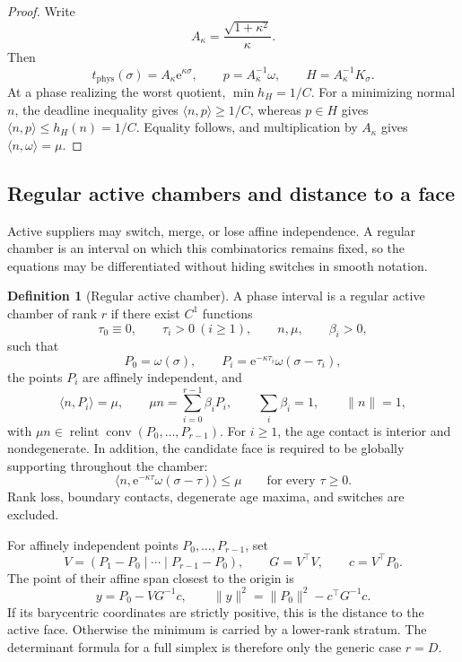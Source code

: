 \documentclass[10pt,a4paper]{article}
\newcommand{\conv}{\operatorname{conv}}
\newcommand{\relint}{\operatorname{relint}}
\newcommand{\e}{\mathrm{e}}
\newcommand{\tphys}{t_{\mathrm{phys}}}
\theoremstyle{plain}
\theoremstyle{definition}
\newtheorem{definition}[theorem]{Definition}
\theoremstyle{remark}
\begin{document}
\begin{proof}
Write
\[
  A_\kappa=\frac{\sqrt{1+\kappa^2}}{\kappa}.
\]
Then
\[
  \tphys(\sigma)=A_\kappa\e^{\kappa\sigma},
  \qquad
  p=A_\kappa^{-1}\omega,
  \qquad
  H=A_\kappa^{-1}K_\sigma.
\]
At a phase realizing the worst quotient, $\min h_H=1/C$. For a minimizing normal $n$, the deadline inequality gives $\langle n,p\rangle\ge1/C$, whereas $p\in H$ gives $\langle n,p\rangle\le h_H(n)=1/C$. Equality follows, and multiplication by $A_\kappa$ gives $\langle n,\omega\rangle=\mu$.
\end{proof}

\subsection{Regular active chambers and distance to a face}

Active suppliers may switch, merge, or lose affine independence. A regular chamber is an interval on which this combinatorics remains fixed, so the equations may be differentiated without hiding switches in smooth notation.

\begin{definition}[Regular active chamber]
A phase interval is a regular active chamber of rank $r$ if there exist $C^1$ functions
\[
  \tau_0\equiv0,
  \qquad \tau_i>0\ (i\ge1),
  \qquad n,\mu,
  \qquad \beta_i>0,
\]
such that
\[
  P_0=\omega(\sigma),
  \qquad
  P_i=\e^{-\kappa\tau_i}\omega(\sigma-\tau_i),
\]
the points $P_i$ are affinely independent, and
\[
  \langle n,P_i\rangle=\mu,
  \qquad
  \mu n=\sum_{i=0}^{r-1}\beta_iP_i,
  \qquad
  \sum_i\beta_i=1,
  \qquad
  \|n\|=1,
\]
with $\mu n\in\relint\conv(P_0,\ldots,P_{r-1})$. For $i\ge1$, the age contact is interior and nondegenerate. In addition, the candidate face is required to be globally supporting throughout the chamber:
\[
  \langle n,\e^{-\kappa\tau}\omega(\sigma-\tau)\rangle\le\mu
  \qquad\text{for every }\tau\ge0.
\]
Rank loss, boundary contacts, degenerate age maxima, and switches are excluded.
\end{definition}

For affinely independent points $P_0,\ldots,P_{r-1}$, set
\[
  V=(P_1-P_0\mid\cdots\mid P_{r-1}-P_0),
  \qquad
  G=V^\top V,
  \qquad
  c=V^\top P_0.
\]
The point of their affine span closest to the origin is
\[
  y=P_0-VG^{-1}c,
  \qquad
  \|y\|^2=\|P_0\|^2-c^\top G^{-1}c.
\]
If its barycentric coordinates are strictly positive, this is the distance to the active face. Otherwise the minimum is carried by a lower-rank stratum. The determinant formula for a full simplex is therefore only the generic case $r=D$.
\end{document}
